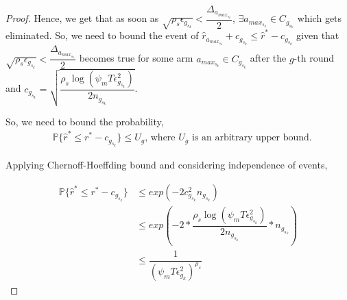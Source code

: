 \begin{proof}
 	Hence, we get that as soon as $\sqrt{\rho_{s}\epsilon_{g_{s_{k}}}}<\dfrac{\Delta_{a_{max_{s_{k}}}}}{2}$, $\exists a_{max_{s_{k}}}\in C_{g_{s_{k}}}$ which gets eliminated.
  So, we need to bound the event of $\hat{r}_{a_{max_{s_{k}}}}+c_{g_{s_{k}}}\leq \hat{r}^{*}-c_{g_{s_{k}}}$ given that $\sqrt{\rho_{s}\epsilon_{g_{s_{k}}}}<\dfrac{\Delta_{a_{max_{s_{k}}}}}{2}$ becomes true for some arm $a_{max_{s_{k}}}\in C_{g_{s_{k}}}$ after the $g$-th round and $c_{g_{s_{k}}}=\sqrt{\dfrac{\rho_{s} \log (\psi_{m}T\epsilon_{g_{s_{k}}}^{2})}{2 n_{g_{s_{k}}}}}$.

% 
	So, we need to bound the probability,
	\begin{align*}
	&\mathbb{P}\lbrace\hat{r}^{*}\leq r^{*} - c_{g_{s_{k}}}\rbrace\leq U_{g}\text{, where $U_{g}$ is an  arbitrary upper bound.}
	\end{align*}
 
Applying Chernoff-Hoeffding bound and considering independence of events,
 
 \begin{align*}
 \mathbb{P}\lbrace\hat{r}^{*} \leq r^{*} - c_{g_{s_{k}}}\rbrace&\leq exp(-2c_{g_{s_{k}}}^{2}n_{g_{s_{k}}})\\
 &\leq exp(-2 * \dfrac{\rho_{s}\log ( \psi_{m}T\epsilon_{g_{s_{k}}}^{2})}{2 n_{g_{s_{k}}}} *n_{g_{s_{k}}})\\
 &\leq \dfrac{1}{(\psi_{m}T\epsilon_{g_{k}}^{2})^{\rho_{s}}}
 \end{align*}


\end{proof}

